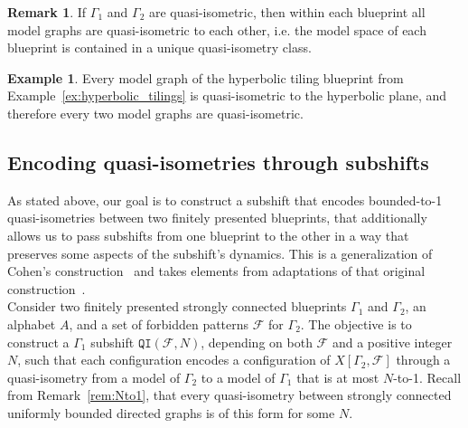 \documentclass{article}
\theoremstyle{definition}
\newtheorem{remark}[theorem]{Remark}
\newtheorem{example}[theorem]{Example} %
\theoremstyle{definition}
\newcommand{\Fo}{\mathcal{F}}
\newcommand{\QI}{\mathtt{QI}}
\begin{document}
\begin{remark} If $\Gamma_1$ and $\Gamma_2$ are quasi-isometric, then within each blueprint all model graphs are quasi-isometric to each other, i.e. the model space of each blueprint is contained in a unique quasi-isometry class.
\end{remark}

\begin{example} Every model graph of the hyperbolic tiling blueprint from Example~\ref{ex:hyperbolic_tilings} is quasi-isometric to the hyperbolic plane, and therefore every two model graphs are quasi-isometric. 
\end{example}



\subsection{Encoding quasi-isometries through subshifts}


As stated above, our goal is to construct a subshift that encodes bounded-to-1 quasi-isometries between two finitely presented blueprints, that additionally allows us to pass subshifts from one blueprint to the other in a way that preserves some aspects of the subshift's dynamics. This is a generalization of Cohen's construction~\cite{cohen2017large} and takes elements from adaptations of that original construction~\cite{barbieri2021groups,barbieri2024medvedev}. \\

Consider two finitely presented  strongly connected blueprints $\Gamma_1$ and $\Gamma_2$, an alphabet $A$, and a set of forbidden patterns $\Fo$ for $\Gamma_2$. The objective is to construct a $\Gamma_1$ subshift $\QI(\Fo, N)$, depending on both $\Fo$ and a positive integer $N$, such that each configuration encodes a configuration of $X[\Gamma_2, \Fo]$ through a quasi-isometry from a model of $\Gamma_2$ to a model of $\Gamma_1$ that is at most $N$-to-1. Recall from Remark~\ref{rem:Nto1}, that every quasi-isometry between strongly connected uniformly bounded directed graphs is of this form for some $N$. 
\end{document}
